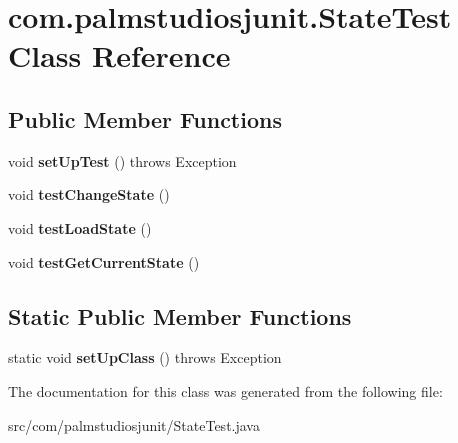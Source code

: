 \hypertarget{classcom_1_1palmstudiosjunit_1_1_state_test}{}\section{com.\+palmstudiosjunit.\+State\+Test Class Reference}
\label{classcom_1_1palmstudiosjunit_1_1_state_test}
\subsection*{Public Member Functions}
\begin{DoxyCompactItemize}
\item 
\mbox{\label{classcom_1_1palmstudiosjunit_1_1_state_test_a25143ec10053a67ab9cf9dce892d75a3}} 
void {\bfseries set\+Up\+Test} ()  throws Exception      
\item 
\mbox{\label{classcom_1_1palmstudiosjunit_1_1_state_test_a47bc1dc5736e1c62f2f0b744fad4e7e6}} 
void {\bfseries test\+Change\+State} ()
\item 
\mbox{\label{classcom_1_1palmstudiosjunit_1_1_state_test_a0e244759a95da9601296248d9bf824b5}} 
void {\bfseries test\+Load\+State} ()
\item 
\mbox{\label{classcom_1_1palmstudiosjunit_1_1_state_test_ac06904a02a4b18bee85784a10cdf33a2}} 
void {\bfseries test\+Get\+Current\+State} ()
\end{DoxyCompactItemize}
\subsection*{Static Public Member Functions}
\begin{DoxyCompactItemize}
\item 
\mbox{\label{classcom_1_1palmstudiosjunit_1_1_state_test_af23af1bf441fe64a7c7fad5cae56b162}} 
static void {\bfseries set\+Up\+Class} ()  throws Exception 	
\end{DoxyCompactItemize}


The documentation for this class was generated from the following file\+:\begin{DoxyCompactItemize}
\item 
src/com/palmstudiosjunit/State\+Test.\+java\end{DoxyCompactItemize}
